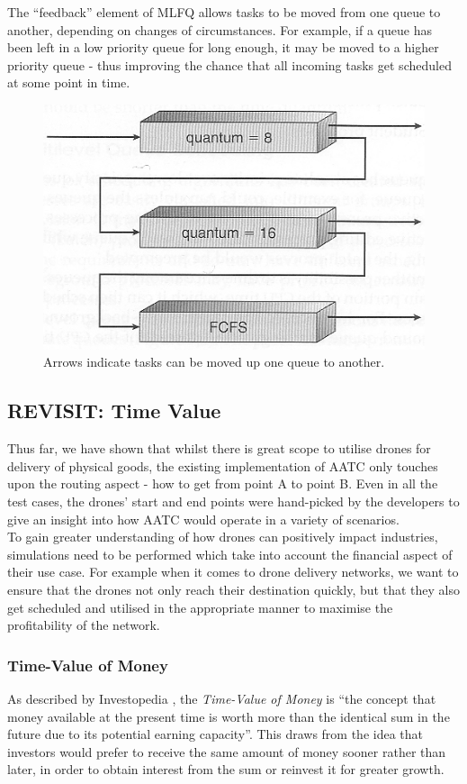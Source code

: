 \documentclass[a4paper,12pt,titlepage]{article}
\begin{document}
The ``feedback'' element of MLFQ allows tasks to be moved from one queue to another, depending on changes of circumstances. For example, if a queue has been left in a low priority queue for long enough, it may be moved to a higher priority queue - thus improving the chance that all incoming tasks get scheduled at some point in time.

\begin{figure}[!hbpt]
  \center
  \includegraphics[width=0.6\linewidth]{img/mlfqs.jpg}
  \caption{Arrows indicate tasks can be moved up one queue to another. \cite{Bell2018}}
  \label{fig:mlfqs}
\end{figure}

\subsection{REVISIT: Time Value}
Thus far, we have shown that whilst there is great scope to utilise drones for delivery of physical goods, the existing implementation of AATC only touches upon the routing aspect - how to get from point A to point B. Even in all the test cases, the drones' start and end points were hand-picked by the developers\cite{Balaji2017} to give an insight into how AATC would operate in a variety of scenarios.\\

To gain greater understanding of how drones can positively impact industries, simulations need to be performed which take into account the financial aspect of their use case. For example when it comes to drone delivery networks, we want to ensure that the drones not only reach their destination quickly, but that they also get scheduled and utilised in the appropriate manner to maximise the profitability of the network.

\subsubsection{Time-Value of Money}
As described by Investopedia \cite{Investopedia}, the \textit{Time-Value of Money} is ``the concept that money available at the present time is worth more than the identical sum in the future due to its potential earning capacity''. This draws from the idea that investors would prefer to receive the same amount of money sooner rather than later, in order to obtain interest from the sum or reinvest it for greater growth.
\end{document}
